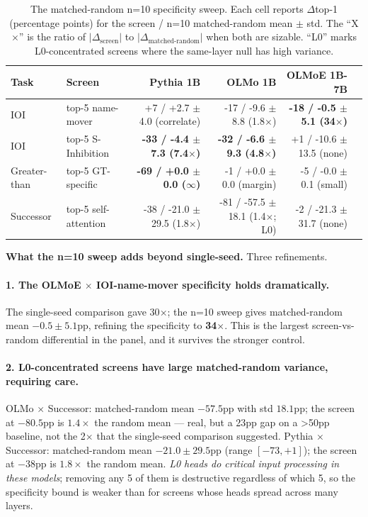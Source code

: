 \documentclass[11pt]{article}
\begin{document}
\begin{table}[h]
\centering
\small
\begin{tabular}{llrrrr}
\toprule
Task & Screen & Pythia 1B & OLMo 1B & OLMoE 1B-7B \\
\midrule
IOI & top-5 name-mover & +7 / +2.7 $\pm$ 4.0 (correlate) & -17 / -9.6 $\pm$ 8.8 (1.8$\times$) & \textbf{-18 / -0.5 $\pm$ 5.1 (34$\times$)} \\
IOI & top-5 S-Inhibition & \textbf{-33 / -4.4 $\pm$ 7.3 (7.4$\times$)} & \textbf{-32 / -6.6 $\pm$ 9.3 (4.8$\times$)} & +1 / -10.6 $\pm$ 13.5 (none) \\
Greater-than & top-5 GT-specific & \textbf{-69 / +0.0 $\pm$ 0.0 ($\infty$)} & -1 / +0.0 $\pm$ 0.0 (margin) & -5 / -0.0 $\pm$ 0.1 (small) \\
Successor & top-5 self-attention & -38 / -21.0 $\pm$ 29.5 (1.8$\times$) & -81 / -57.5 $\pm$ 18.1 (1.4$\times$; L0) & -2 / -21.3 $\pm$ 31.7 (none) \\
\bottomrule
\end{tabular}
\caption{The matched-random n=10 specificity sweep. Each cell reports $\Delta$top-1 (percentage points) for the screen / n=10 matched-random mean $\pm$ std. The ``X$\times$'' is the ratio of $|\Delta_\text{screen}|$ to $|\Delta_\text{matched-random}|$ when both are sizable. ``L0'' marks L0-concentrated screens where the same-layer null has high variance.}
\label{tab:mr-sweep}
\end{table}

\textbf{What the n=10 sweep adds beyond single-seed.} Three refinements.

\paragraph{1. The OLMoE $\times$ IOI-name-mover specificity holds dramatically.} The single-seed comparison gave 30$\times$; the n=10 sweep gives matched-random mean $-0.5 \pm 5.1$pp, refining the specificity to \textbf{34$\times$}. This is the largest screen-vs-random differential in the panel, and it survives the stronger control.

\paragraph{2. L0-concentrated screens have large matched-random variance, requiring care.} OLMo $\times$ Successor: matched-random mean $-57.5$pp with std $18.1$pp; the screen at $-80.5$pp is $1.4\times$ the random mean --- real, but a 23pp gap on a >50pp baseline, not the 2$\times$ that the single-seed comparison suggested. Pythia $\times$ Successor: matched-random mean $-21.0 \pm 29.5$pp (range $[-73, +1]$); the screen at $-38$pp is $1.8\times$ the random mean. \emph{L0 heads do critical input processing in these models}; removing any 5 of them is destructive regardless of which 5, so the specificity bound is weaker than for screens whose heads spread across many layers.
\end{document}
